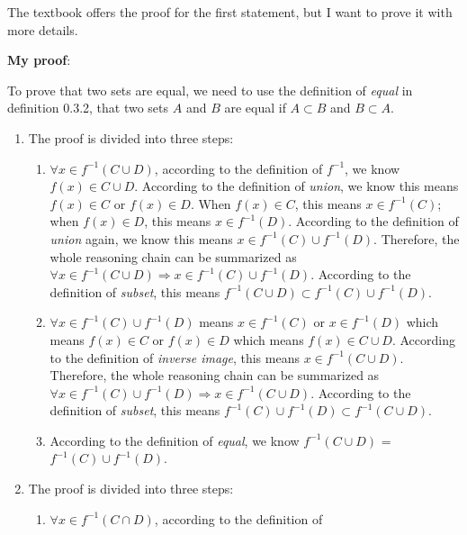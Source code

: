 \documentclass[12pt, letterpaper, oneside]{book}
\begin{document}
The textbook offers the proof for the first statement, but I want to prove it
with more details.

\textbf{My proof}:

To prove that two sets are equal, we need to use the definition of \textit{
  equal} in definition 0.3.2, that two sets $A$ and $B$ are equal if $A \subset B$
and $B \subset A$.

\begin{enumerate}
  \item The proof is divided into three steps:
        \begin{enumerate}
          \item $\forall x \in f^{-1}(C \cup D)$, according to the definition of
                $f^{-1}$, we know $f(x) \in C \cup D$. According to the definition of
                \textit{union}, we know this means $f(x) \in C$ or $f(x) \in D$. When
                $f(x) \in C$, this means $x \in f^{-1}(C)$; when $f(x) \in D$, this
                means $x \in f^{-1}(D)$. According to the definition of \textit{union}
                again, we know this means $x \in f^{-1}(C) \cup f^{-1}(D)$. Therefore,
                the whole reasoning chain can be summarized as $\forall x \in f^{-1}(C
                  \cup D) \Rightarrow x \in f^{-1}(C) \cup f^{-1}(D)$. According to the
                definition of \textit{subset}, this means $f^{-1}(C \cup D) \subset
                  f^{-1}(C) \cup f^{-1}(D)$.
          \item $\forall x \in f^{-1}(C) \cup f^{-1}(D)$ means $x \in f^{-1}(C)$ or
                $x \in f^{-1}(D)$ which means $f(x) \in C$ or $f(x) \in D$ which means
                $f(x) \in C \cup D$. According to the definition of \textit{inverse
                  image}, this means $x \in f^{-1}(C \cup D)$. Therefore, the whole
                reasoning chain can be summarized as $\forall x \in f^{-1}(C) \cup
                  f^{-1}(D) \Rightarrow x \in f^{-1}(C \cup D)$. According to the
                definition of \textit{subset}, this means $f^{-1}(C) \cup f^{-1}(D)
                  \subset f^{-1}(C \cup D)$.
          \item According to the definition of \textit{equal}, we know $f^{-1}(C
                  \cup D)$ = $f^{-1}(C) \cup f^{-1}(D)$.
        \end{enumerate}
  \item The proof is divided into three steps:
        \begin{enumerate}
          \item $\forall x \in f^{-1}(C \cap D)$, according to the definition of

\end{enumerate}
\end{enumerate}
\end{document}
